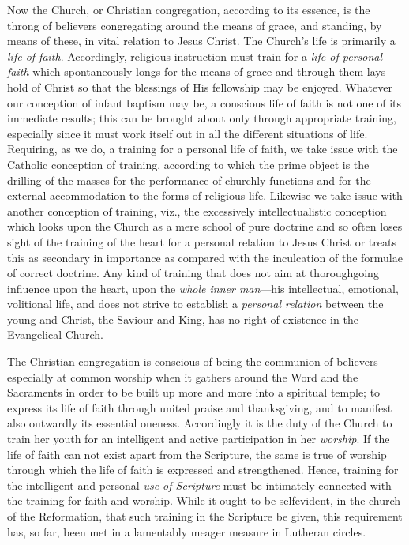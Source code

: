 Now the Church, or Christian congregation, according to its essence, is the throng of believers congregating around the means of grace, and standing, by means of these, in vital relation to Jesus Christ. The Church’s life is primarily a \emph{life of faith}. Accordingly, religious instruction must train for a \emph{life of personal faith} which spontaneously longs for the means of grace and through them lays hold of Christ so that the blessings of His fellowship may be enjoyed. Whatever our conception of infant baptism may be, a conscious life of faith is not one of its immediate results; this can be brought about only through appropriate training, especially since it must work itself out in all the different situations of life. Requiring, as we do, a training for a personal life of faith, we take issue with the Catholic conception of training, according to which the prime object is the drilling of the masses for the performance of churchly functions and for the external accommodation to the forms of religious life. Likewise we take issue with another conception of training, viz., the excessively intellectualistic conception which looks upon the Church as a mere school of pure doctrine and so often loses sight of the training of the heart for a personal relation to Jesus Christ or treats this as secondary in importance as compared with the inculcation of the formulae of correct doctrine. Any kind of training that does not aim at thoroughgoing influence upon the heart, upon the \emph{whole inner man}—his intellectual, emotional, volitional life, and
does not strive to establish a \emph{personal relation} between the young and Christ, the Saviour and King, has no right of existence in the Evangelical Church.

The Christian congregation is conscious of being the communion of believers especially at common worship when it gathers around the Word and the Sacraments in order to be built up more and more into a spiritual temple; to express its life of faith through united praise and thanksgiving, and to manifest also outwardly its essential oneness. Accordingly it is the duty of the Church to train her youth for an intelligent and active participation in her \emph{worship}. If the life of faith can not exist apart from the Scripture, the same is true of worship through which the life of faith is expressed and strengthened. Hence, training for the intelligent and personal \emph{use of Scripture} must be intimately connected with the training for faith and worship. While it ought to be selfevident, in the church of the Reformation, that such training in the Scripture be given, this requirement has, so far, been met in a lamentably meager measure in Lutheran circles.

